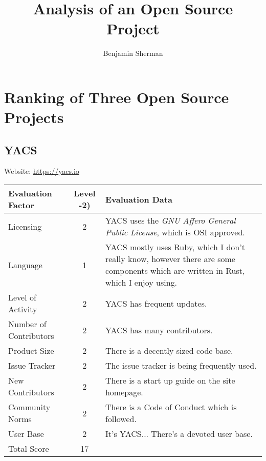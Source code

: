 \documentclass[11pt]{article}
\title{\vspace{-2cm}\bf Analysis of an Open Source Project}
\author{Benjamin Sherman}
\date{}
\begin{document}
\maketitle

\section{Ranking of Three Open Source Projects}
\subsection{YACS}
\nopagebreak
Website: \url{https://yacs.io}
\nopagebreak
\begin{center}
\begin{tabularx}{\textwidth}{|l|c|X|}
	\hline
	\textbf{Evaluation Factor} & \textbf{Level -2)} & \textbf{Evaluation Data} \\\hline
	Licensing & 2 & YACS uses the \textit{GNU Affero General Public License}, which is OSI approved.\\\hline
	Language & 1 & YACS mostly uses Ruby, which I don't really know, however there are some components which are written in Rust, which I enjoy using.\\\hline
	Level of Activity & 2 & YACS has frequent updates.\\\hline
	Number of Contributors & 2 & YACS has many contributors.\\\hline
	Product Size & 2 & There is a decently sized code base.\\\hline
	Issue Tracker & 2 & The issue tracker is being frequently used.\\\hline
	New Contributors & 2 & There is a start up guide on the site homepage.\\\hline
	Community Norms & 2 & There is a Code of Conduct which is followed.\\\hline
	User Base & 2 & It's YACS... There's a devoted user base.\\\hline
	Total Score & 17 & \\\hline
\end{tabularx}
\end{center}

\end{document}
